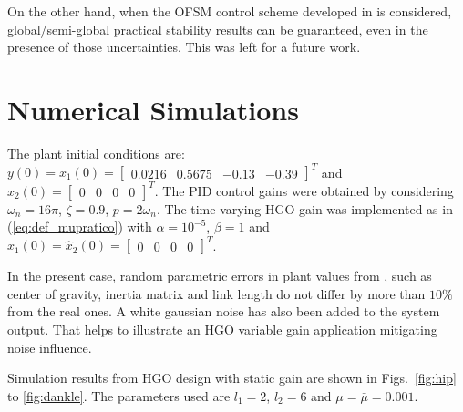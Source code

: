 \documentclass[letterpaper, 10 pt, conference]{ieeeconf}  %
\theoremstyle{plain}
\theoremstyle{definition}
\theoremstyle{remark}
\begin{document}
  
On the other hand, when the OFSM control scheme developed in \cite{POH:2011} is considered,  global/semi-global practical stability results can be guaranteed, even in the presence of those uncertainties. This was left for a future work.





%
%
%
%


\section{Numerical Simulations}
\label{sec:Numerical_Simulation}

The plant initial conditions are: $y(0)=x_1(0)=\left[\begin{array}{cccc} 0.0216  & 0.5675 & -0.13 & -0.39\end{array} \right ]^T$ and $x_2(0)=\left[\begin{array}{cccc} 0  & 0 & 0 & 0\end{array} \right ]^T$. The PID control gains were obtained by considering $\omega_n = 16\pi$, $\zeta = 0.9$, $p = 2\omega_n$. The time varying HGO gain was implemented as in (\ref{eq:def_mupratico}) with $\alpha=10^{-5}$, $\beta=1$ and $\hat{x}_1(0) = \hat{x}_2(0) = \left[\begin{array}{cccc} 0  & 0 & 0 & 0\end{array} \right ]^T$.

In the present case, random parametric errors in plant values from \cite{Richter2015}, such as center of gravity, inertia matrix and link length do not differ by more than $10\%$ from the real ones. A white gaussian noise has also been added to the system output. That helps to illustrate an HGO variable gain application mitigating noise influence.

Simulation results from HGO design with static gain are shown in Figs.~\ref{fig:hip} to \ref{fig:dankle}. The parameters used are $l_1=2$, $l_2=6$ and $\mu=\bar{\mu}=0.001$.
\end{document}
